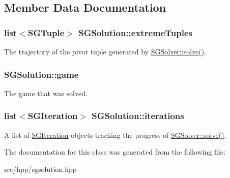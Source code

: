 \subsection{Member Data Documentation}
\hypertarget{classSGSolution_a8b3448a35113785102b6c5193ab87dc6}{
\subsubsection[{extreme\-Tuples}]{\setlength{\rightskip}{0pt plus 5cm}list$<${\bf S\-G\-Tuple}$>$ S\-G\-Solution\-::extreme\-Tuples}}\label{classSGSolution_a8b3448a35113785102b6c5193ab87dc6}
The trajectory of the pivot tuple generated by \hyperlink{classSGSolver_a220dd431eabdd9ff8419fafb28b7b990}{S\-G\-Solver\-::solve()}. \hypertarget{classSGSolution_a7358a0ff1476b3dd1eefaa96f2efd8ed}{
\subsubsection[{game}]{ S\-G\-Solution\-::game}}\label{classSGSolution_a7358a0ff1476b3dd1eefaa96f2efd8ed}
The game that was solved. \hypertarget{classSGSolution_a7216ae67bed2fb1ede826053c1612fcb}{
\subsubsection[{iterations}]{\setlength{\rightskip}{0pt plus 5cm}list$<${\bf S\-G\-Iteration}$>$ S\-G\-Solution\-::iterations}}\label{classSGSolution_a7216ae67bed2fb1ede826053c1612fcb}
A list of \hyperlink{classSGIteration}{S\-G\-Iteration} objects tracking the progress of \hyperlink{classSGSolver_a220dd431eabdd9ff8419fafb28b7b990}{S\-G\-Solver\-::solve()}. 

The documentation for this class was generated from the following file\-:\begin{DoxyCompactItemize}
\item 
src/hpp/sgsolution.\-hpp\end{DoxyCompactItemize}
